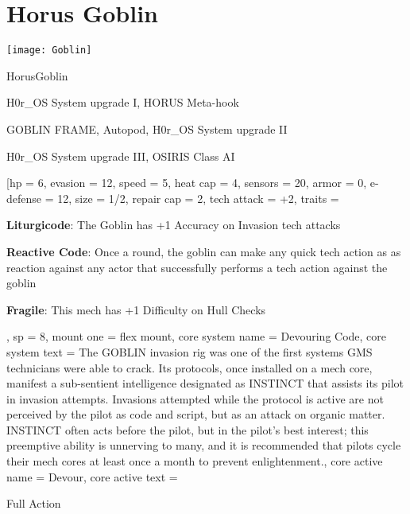 \section{Horus Goblin}

\begin{center}
    \texttt{[image: Goblin]}
\end{center}

\begin{mech}{Horus}{Goblin}


\begin{license}
\item H0r\_OS System upgrade I, HORUS Meta-hook
\item GOBLIN FRAME, Autopod, H0r\_OS System upgrade II
\item H0r\_OS System upgrade III, OSIRIS Class AI
\end{license}


\frameBox
[hp = 6,
evasion = 12,
speed = 5,
heat cap = 4,
sensors = 20,
armor = 0,
e-defense = 12,
size = 1/2,
repair cap = 2,
tech attack = +2,
traits = {  
  \textbf{Liturgicode}: The Goblin has +1 Accuracy on Invasion tech attacks 

  \textbf{Reactive Code}: Once a round, the goblin can make any quick tech action as as reaction against any actor that successfully performs a tech action against the goblin
  
  \textbf{Fragile}: This mech has +1 Difficulty on Hull Checks
  },
sp = 8,
mount one = flex mount,
core system name = Devouring Code,
core system text = {The GOBLIN invasion rig was one of the first systems GMS technicians were able to crack. Its protocols, once installed on a mech core, manifest a sub-sentient intelligence designated as INSTINCT that assists its pilot in invasion attempts. Invasions attempted while the protocol is active are not perceived by the pilot as code and script, but as an attack on organic matter. INSTINCT often acts before the pilot, but in the pilot’s best interest; this preemptive ability is unnerving to many, and it is recommended that pilots cycle their mech cores at least once a month to prevent enlightenment.},
core active name = Devour,
core active text = {Full Action

}
\end{mech}
